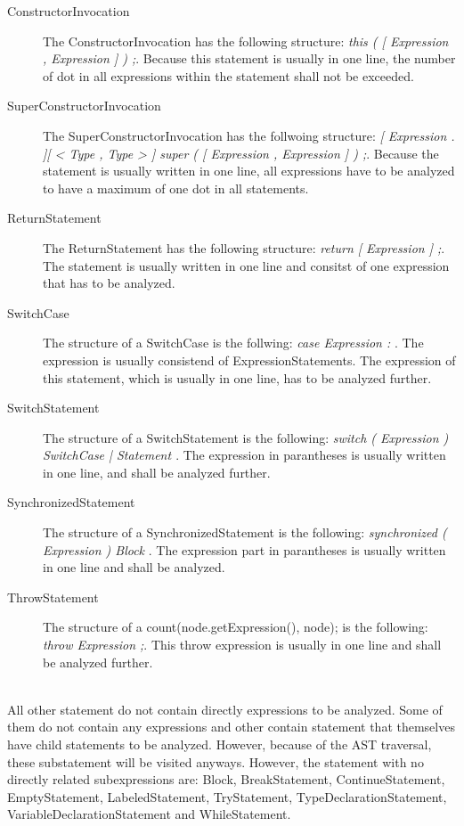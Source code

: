 \begin{description}
  \item[ConstructorInvocation] The ConstructorInvocation has the following structure: \textit{this ( [ Expression { , Expression } ] ) ;}. Because this statement is usually in one line, the number of dot in all expressions within the statement shall not be exceeded.
  \item[SuperConstructorInvocation] The SuperConstructorInvocation has the follwoing structure: \textit{[ Expression . ][ < Type { , Type } > ] super ( [ Expression { , Expression } ] ) ;}. Because the statement is usually written in one line, all expressions have to be analyzed to have a maximum of one dot in all statements.
  \item[ReturnStatement] The ReturnStatement has the following structure: \textit{return [ Expression ] ;}. The statement is usually written in one line and consitst of one expression that has to be analyzed.
  \item[SwitchCase] The structure of a SwitchCase is the follwing: \textit{ case Expression  : }. The expression is usually consistend of ExpressionStatements. The expression of this statement, which is usually in one line, has to be analyzed further.
  \item[SwitchStatement] The structure of a SwitchStatement is the following: \textit{ switch ( Expression ) { { SwitchCase | Statement } } }. The expression in parantheses is usually written in one line, and shall be analyzed further. 
  \item[SynchronizedStatement] The structure of a SynchronizedStatement is the following: \textit{  synchronized ( Expression ) Block }. The expression part in parantheses is usually written in one line and shall be analyzed.
  \item[ThrowStatement] The structure of a count(node.getExpression(), node); is the following: \textit{throw Expression ;}. This throw expression is usually in one line and shall be analyzed further.
\end{description}
\\

All other statement do not contain directly expressions to be analyzed. Some of them do not contain any expressions and other contain statement that themselves have child statements to be analyzed. However, because of the \acf{AST} traversal, these substatement will be visited anyways. However, the statement with no directly related subexpressions are: Block, BreakStatement, ContinueStatement, EmptyStatement, LabeledStatement, TryStatement, TypeDeclarationStatement, VariableDeclarationStatement and WhileStatement.
\\

